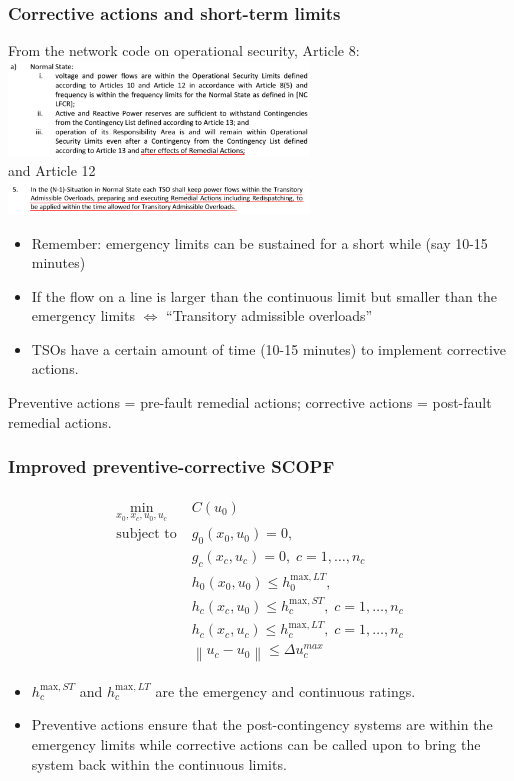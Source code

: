 \documentclass[compress]{beamer}
\newcommand\norm[1]{\left\lVert#1\right\rVert}
\begin{document}
\begin{frame}
  \frametitle{Corrective actions and short-term limits}
From the network code on operational security, Article 8:
\includegraphics[width=0.6\textwidth]{Figs/NormalStateRA.png}\\
and Article 12 \\
\includegraphics[width=0.6\textwidth]{Figs/RA_ShortTermLimits.png}
\begin{itemize}
\item Remember: emergency limits can be sustained for a short while (say 10-15 minutes)
\item If the flow on a line is larger than the continuous limit but smaller than the emergency limits $\Leftrightarrow$ ``Transitory admissible overloads''
\item TSOs have a certain amount of time (10-15 minutes) to implement corrective actions.
\end{itemize}
\scriptsize Preventive actions = pre-fault remedial actions; corrective actions = post-fault remedial actions.
\end{frame}



\begin{frame}
  \frametitle{Improved preventive-corrective SCOPF}
  \begin{align}
  \tag{PC-SCOPF}
    \begin{split}
    \min_{x_0,x_c,u_0,u_c} \; & C(u_0) \\
    \text{subject to} \; & g_0(x_0,u_0) = 0, \; \\
    & g_c(x_c,u_c) = 0, \; c = 1,\ldots,n_c \\
    & h_0(x_0,u_0) \leq h_0^{\text{max},LT}, \\
    & h_c(x_c,u_0) \leq h_c^{\text{max},ST}, \; c = 1,\ldots,n_c \\
    & h_c(x_c,u_c) \leq h_c^{\text{max},LT}, \; c = 1,\ldots,n_c \\
    & \norm{u_c - u_0} \leq \Delta u_c^{max}
    \end{split}
  \end{align}
  \begin{itemize}
  \item $h_c^{\text{max},ST}$ and $h_c^{\text{max},LT}$ are the emergency and continuous ratings.
  \item Preventive actions ensure that the post-contingency systems are within the emergency limits while corrective actions can be called upon to bring the system back within the continuous limits.
  \end{itemize}
\end{frame}
\end{document}
